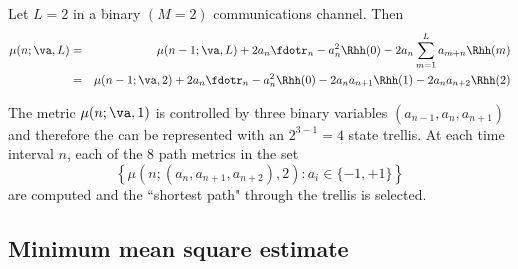 \begin{example}
Let $L=2$ in a binary $(M=2)$ communications channel.
Then 
\begin{eqnarray*}
   \mu(n;\va ,L) 
     &=& \mu(n-1;\va ,L) +
         2a_n \fdotr_n -a_n^2 \Rhh(0) - 2a_n\sum_{m=1}^L a_{m+n} \Rhh(m)
   \\&=& \mu(n-1;\va ,2) +
         2a_n \fdotr_n -a_n^2 \Rhh(0) 
       - 2a_n a_{n+1} \Rhh(1)
       - 2a_n a_{n+2} \Rhh(2)
\end{eqnarray*}


The metric $\mu(n;\va ,1)$ is controlled by three binary variables
$(a_{n-1},a_n,a_{n+1})$ and therefore the can be represented with 
an $2^{3-1}=4$ state trellis.
At each time interval $n$, each of the 8 path metrics in the set
\[ 
   \left\{ \mu(n;(a_n,a_{n+1},a_{n+2}),2): a_i\in\{-1,+1\} \right\}
\]
are computed and the ``shortest path" through the trellis is selected.
\end{example}





\subsection{Minimum mean square estimate}
\label{sec:eq_mmse}

